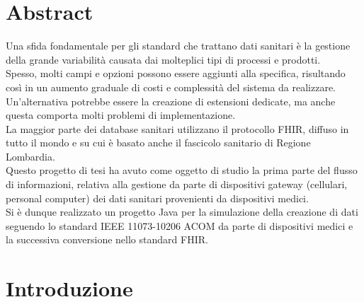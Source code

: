 \documentclass[a4paper]{article}
\begin{document}
\clearpage
\null
\thispagestyle{empty}
\clearpage

\section*{Abstract}
Una sfida fondamentale per gli standard che trattano dati sanitari è la gestione della grande variabilità causata dai molteplici tipi di processi e prodotti. \\
Spesso, molti campi e opzioni possono essere aggiunti alla specifica, risultando così in un aumento graduale di costi e complessità del sistema da realizzare. \\
Un'alternativa potrebbe essere la creazione di estensioni dedicate, ma anche questa comporta molti problemi di implementazione.
\\
La maggior parte dei database sanitari utilizzano il protocollo FHIR, diffuso in tutto il mondo e su cui è basato anche il fascicolo sanitario di Regione Lombardia. 
\\
Questo progetto di tesi ha avuto come oggetto di studio la prima parte del flusso di informazioni, relativa alla gestione da parte di dispositivi gateway (cellulari, personal computer) dei dati sanitari provenienti da dispositivi medici.\\
Si è dunque realizzato un progetto Java per la simulazione della creazione di dati seguendo lo standard IEEE 11073-10206 ACOM da parte di dispositivi medici e la successiva conversione nello standard FHIR.


\clearpage
\null
\thispagestyle{empty}

\clearpage

\tableofcontents
\newpage
\section{Introduzione}
\end{document}
